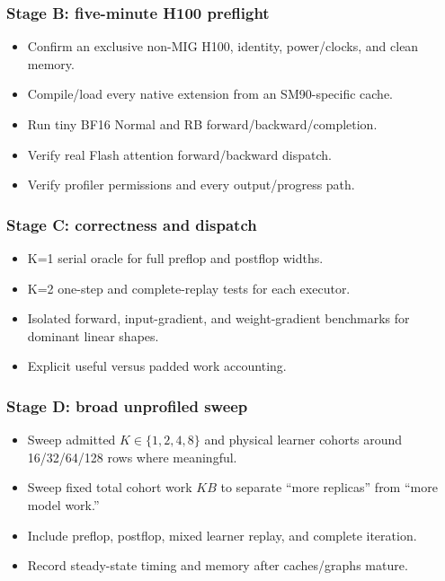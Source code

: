 \documentclass[
  10pt,
  letterpaper,
]{article}
\providecommand{\tightlist}{%
  \setlength{\itemsep}{0pt}\setlength{\parskip}{0pt}}
\begin{document}
\subsubsection{Stage B: five-minute H100
preflight}\label{stage-b-five-minute-h100-preflight}

\begin{itemize}
\tightlist
\item
  Confirm an exclusive non-MIG H100, identity, power/clocks, and clean
  memory.
\item
  Compile/load every native extension from an SM90-specific cache.
\item
  Run tiny BF16 Normal and RB forward/backward/completion.
\item
  Verify real Flash attention forward/backward dispatch.
\item
  Verify profiler permissions and every output/progress path.
\end{itemize}

\subsubsection{Stage C: correctness and
dispatch}\label{stage-c-correctness-and-dispatch}

\begin{itemize}
\tightlist
\item
  K=1 serial oracle for full preflop and postflop widths.
\item
  K=2 one-step and complete-replay tests for each executor.
\item
  Isolated forward, input-gradient, and weight-gradient benchmarks for
  dominant linear shapes.
\item
  Explicit useful versus padded work accounting.
\end{itemize}

\subsubsection{Stage D: broad unprofiled
sweep}\label{stage-d-broad-unprofiled-sweep}

\begin{itemize}
\tightlist
\item
  Sweep admitted \(K\in\{1,2,4,8\}\) and physical learner cohorts around
  16/32/64/128 rows where meaningful.
\item
  Sweep fixed total cohort work \(KB\) to separate ``more replicas''
  from ``more model work.''
\item
  Include preflop, postflop, mixed learner replay, and complete
  iteration.
\item
  Record steady-state timing and memory after caches/graphs mature.
\end{itemize}
\end{document}
